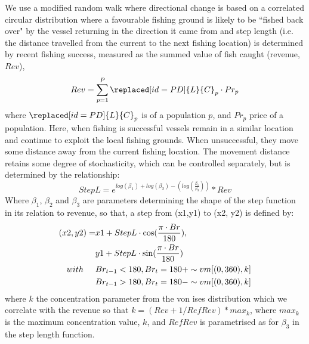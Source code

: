 \documentclass[review]{elsarticle}
\begin{document}
We use a modified random walk where directional change is based on a correlated
circular distribution where a favourable fishing ground is likely to be
``fished back over" by the vessel returning in the direction it came from and
step length (i.e. the distance travelled from the current to the next fishing
location) is determined by  recent fishing success,
measured as the summed value of fish caught (revenue, $Rev$),
\begin{equation}
Rev = \sum_{p=1}^{P} \replaced[id=PD]{L}{C}_{p} \cdot Pr_{p} 
\end{equation}
where $\replaced[id=PD]{L}{C}_{p}$ is  of a
population $p$, and $Pr_{p}$ price of a population. Here, when fishing is
successful vessels remain in a similar location and continue to exploit the
local fishing grounds. When unsuccessful, they move some distance away from
the current fishing location.  The movement distance retains some degree of
stochasticity, which can be controlled separately, but is determined by the
relationship: 
\begin{equation*}
	StepL = e^{log(\beta_{1}) + log(\beta_{2}) -
		(log(\frac{\beta_{1}}{\beta_{3}}))} * Rev
\end{equation*}
Where $\beta_{1}$, $\beta_{2}$ and $\beta_{3}$ are parameters determining the
shape of the step function in its relation to revenue, so that, a step from
(x1,y1) to (x2, y2) is defined by:
\begin{equation*}
	\begin{split}
 (x2, y2) =  & x1 + StepL \cdot \cos (\frac{\pi \cdot Br}{180}), \\
             & y1 + StepL \cdot \sin (\frac{\pi \cdot Br}{180}) \\	
 with  \hspace{0.5cm}     & Br_{t-1} < 180, Br_{t} = 180 + \sim vm[(0,360), k] \\
 			  & Br_{t-1} > 180, Br_{t} = 180 - \sim vm[(0,360), k] \\
	\end{split}
\end{equation*}
where $k$ the concentration parameter from the von ises
distribution which we correlate with the revenue so that $k = (Rev + 1 /
RefRev) * max_{k}$, where $max_{k}$ is the maximum concentration value, $k$,
and $RefRev$ is parametrised as for $\beta_{3}$ in the step length function. 
\end{document}
